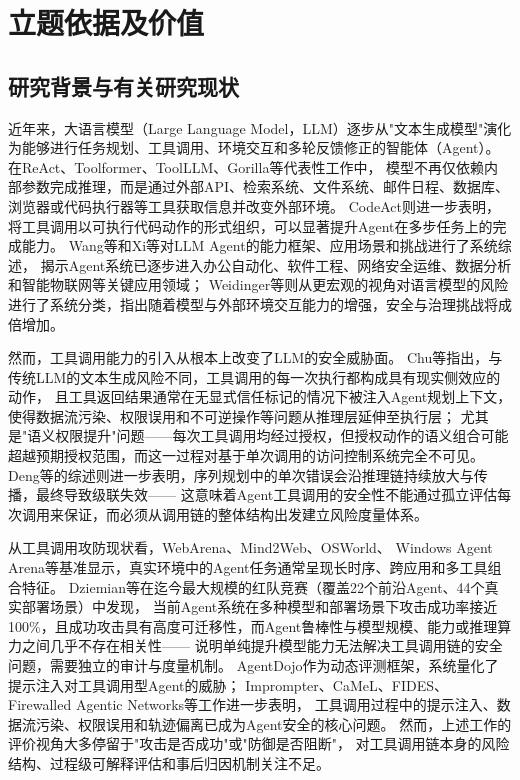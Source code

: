 \section{立题依据及价值}

\subsection{研究背景与有关研究现状}

近年来，大语言模型（Large Language Model，LLM）逐步从"文本生成模型"演化为能够进行任务规划、工具调用、环境交互和多轮反馈修正的智能体（Agent）。
在ReAct\cite{yao2023react}、Toolformer\cite{schick2023toolformer}、ToolLLM\cite{qin2024toolllm}、Gorilla\cite{patil2024gorilla}等代表性工作中，
模型不再仅依赖内部参数完成推理，而是通过外部API、检索系统、文件系统、邮件日程、数据库、浏览器或代码执行器等工具获取信息并改变外部环境。
CodeAct\cite{wang2024codeact}则进一步表明，将工具调用以可执行代码动作的形式组织，可以显著提升Agent在多步任务上的完成能力。
Wang等\cite{wang2024survey_agents}和Xi等\cite{xi2025rise}对LLM Agent的能力框架、应用场景和挑战进行了系统综述，
揭示Agent系统已逐步进入办公自动化、软件工程、网络安全运维、数据分析和智能物联网等关键应用领域\cite{park2023generative}；
Weidinger等\cite{weidinger2022taxonomy}则从更宏观的视角对语言模型的风险进行了系统分类，指出随着模型与外部环境交互能力的增强，安全与治理挑战将成倍增加。

然而，工具调用能力的引入从根本上改变了LLM的安全威胁面。
Chu等\cite{chu2026systematic}指出，与传统LLM的文本生成风险不同，工具调用的每一次执行都构成具有现实侧效应的动作，
且工具返回结果通常在无显式信任标记的情况下被注入Agent规划上下文，使得数据流污染、权限误用和不可逆操作等问题从推理层延伸至执行层；
尤其是"语义权限提升"问题——每次工具调用均经过授权，但授权动作的语义组合可能超越预期授权范围，而这一过程对基于单次调用的访问控制系统完全不可见。
Deng等\cite{deng2025agentsunderthreat}的综述则进一步表明，序列规划中的单次错误会沿推理链持续放大与传播，最终导致级联失效——
这意味着Agent工具调用的安全性不能通过孤立评估每次调用来保证，而必须从调用链的整体结构出发建立风险度量体系。

从工具调用攻防现状看，WebArena\cite{zhou2023webarena}、Mind2Web\cite{deng2023mind2web}、OSWorld\cite{xie2024osworld}、
Windows Agent Arena\cite{bonatti2025windows}等基准显示，真实环境中的Agent任务通常呈现长时序、跨应用和多工具组合特征。
Dziemian等\cite{dziemian2026vulnerable}在迄今最大规模的红队竞赛（覆盖22个前沿Agent、44个真实部署场景）中发现，
当前Agent系统在多种模型和部署场景下攻击成功率接近100\%，且成功攻击具有高度可迁移性，而Agent鲁棒性与模型规模、能力或推理算力之间几乎不存在相关性——
说明单纯提升模型能力无法解决工具调用链的安全问题，需要独立的审计与度量机制。
AgentDojo\cite{balunovic2024agentdojo}作为动态评测框架，系统量化了提示注入对工具调用型Agent的威胁；
Imprompter\cite{fu2024imprompter}、CaMeL\cite{debenedetti2025camel}、FIDES\cite{costa2025fides}、
Firewalled Agentic Networks\cite{abdelnabi2025firewalls}等工作进一步表明，
工具调用过程中的提示注入、数据流污染、权限误用和轨迹偏离已成为Agent安全的核心问题。
然而，上述工作的评价视角大多停留于"攻击是否成功"或"防御是否阻断"，
对工具调用链本身的风险结构、过程级可解释评估和事后归因机制关注不足。

